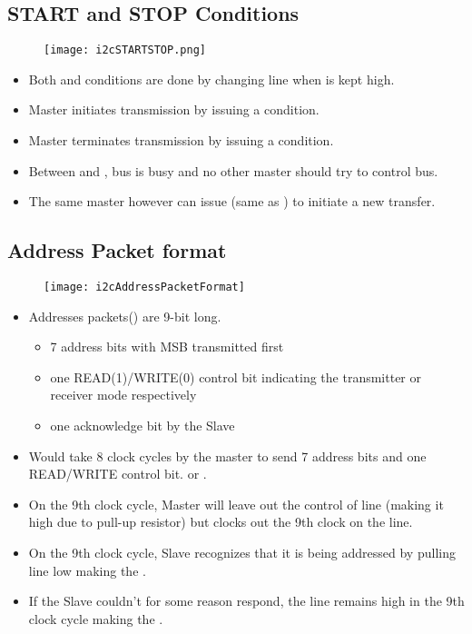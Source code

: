 \documentclass{article}
\begin{document}
\subsection{START and STOP Conditions}
\begin{figure}[H]
    \centering
    \texttt{[image: i2cSTARTSTOP.png]}
\end{figure}
\begin{itemize}
	\item Both  and  conditions are done by changing  line when  is kept high.
	\item Master initiates transmission by issuing a  condition.
	\item Master terminates transmission by issuing a  condition.
	\item Between  and , bus is busy and no other master should try to control bus.
	\item The same master however can issue (same as ) to initiate a new transfer.
\end{itemize}

\subsection{Address Packet format}
    \begin{figure}[H]
        \begin{center}
            \texttt{[image: i2cAddressPacketFormat]}
        \end{center}
    \end{figure}
\begin{itemize}
	\item Addresses packets() are 9-bit long.
	\begin{itemize}
		\item 7 address bits with MSB transmitted first
		\item one READ(1)/WRITE(0) control bit indicating the transmitter or receiver mode respectively
		\item one acknowledge bit by the Slave	
	\end{itemize}	
	\item Would take 8 clock cycles by the master to send 7 address bits and one READ/WRITE control bit.  or .
	\item On the 9th clock cycle, Master will leave out the control of  line (making it high due to pull-up resistor) but clocks out the 9th clock on the  line.
	\item On the 9th clock cycle, Slave recognizes that it is being addressed by pulling  line low making the .
	\item If the Slave couldn’t for some reason respond, the  line remains high in the 9th clock cycle making the .
\end{itemize}
\end{document}
